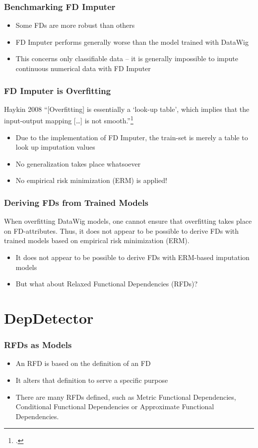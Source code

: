 \documentclass{beamer}
\begin{document}
\begin{frame}
    \frametitle{Benchmarking FD Imputer}
    \begin{itemize}
        \item Some FDs are more robust than others
        \item FD Imputer performs generally worse than the model trained with DataWig
        \item This concerns only classifiable data -- it is generally impossible to impute continuous numerical data with FD Imputer
    \end{itemize}
\end{frame}

\begin{frame}
    \frametitle{FD Imputer is Overfitting}
    \begin{block}{Haykin 2008}
        ``[Overfitting] is essentially a `look-up table', which implies that the input-output mapping [\dots] is not smooth.''\footcite[p.~165]{HAY08}
    \end{block}
    \pause
    \begin{itemize}
        \item Due to the implementation of FD Imputer, the train-set is merely a table to look up imputation values
        \item No generalization takes place whatsoever
        \item No empirical risk minimization (ERM) is applied!
    \end{itemize}
\end{frame}

\begin{frame}
    \frametitle{Deriving FDs from Trained Models}
 When overfitting DataWig models, one cannot ensure that overfitting takes place on FD-attributes. Thus, it does not appear to be possible to derive FDs with trained models based on empirical risk minimization (ERM).
    \begin{itemize}
        \item It does not appear to be possible to derive FDs with ERM-based imputation models
        \item But what about Relaxed Functional Dependencies (RFDs)?
    \end{itemize}
\end{frame}

\section{DepDetector}
\begin{frame}
    \frametitle{RFDs as Models}
    \begin{itemize}
        \item An RFD is based on the definition of an FD
        \item It alters that definition to serve a specific purpose
        \item There are many RFDs defined, such as Metric Functional Dependencies, Conditional Functional Dependencies or Approximate Functional Dependencies.
    \end{itemize}
\end{frame}
\end{document}
